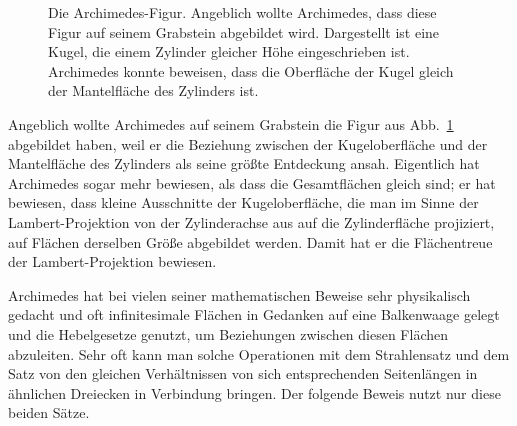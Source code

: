 \begin{figure}
\caption{\label{fig_Archimedes}%
Die Archimedes-Figur. Angeblich wollte Archimedes, dass diese Figur auf seinem Grabstein abgebildet
wird. Dargestellt ist eine Kugel, die einem Zylinder gleicher H\"ohe eingeschrieben ist. 
Archimedes konnte beweisen, dass die Oberfl\"ache der Kugel gleich der Mantelfl\"ache des
Zylinders ist.} 
\end{figure}

Angeblich wollte Archimedes auf seinem Grabstein die Figur aus Abb.\ \ref{fig_Archimedes} 
abgebildet haben, weil er die Beziehung zwischen der Kugeloberfl\"ache und der Mantelfl\"ache
des Zylinders als seine gr\"o\ss te Entdeckung ansah. Eigentlich hat Archimedes sogar mehr
bewiesen, als dass die Gesamtfl\"achen gleich sind; er hat bewiesen, dass kleine Ausschnitte
der Kugeloberfl\"ache, die man im Sinne der Lambert-Projektion von der Zylinderachse aus
auf die Zylinderfl\"ache projiziert, auf Fl\"achen derselben Gr\"o\ss e abgebildet werden. Damit
hat er die Fl\"achentreue der Lambert-Projektion bewiesen. 

Archimedes hat bei vielen seiner mathematischen Beweise sehr physikalisch gedacht und
oft infinitesimale Fl\"achen in Gedanken auf eine Balkenwaage gelegt und die Hebelgesetze
genutzt, um Beziehungen zwischen diesen Fl\"achen abzuleiten.  
Sehr oft kann man solche Operationen mit dem Strahlensatz und dem
Satz von den gleichen Verh\"altnissen von sich entsprechenden Seitenl\"angen in \"ahnlichen 
Dreiecken in Verbindung bringen. Der folgende Beweis nutzt nur diese beiden S\"atze.

